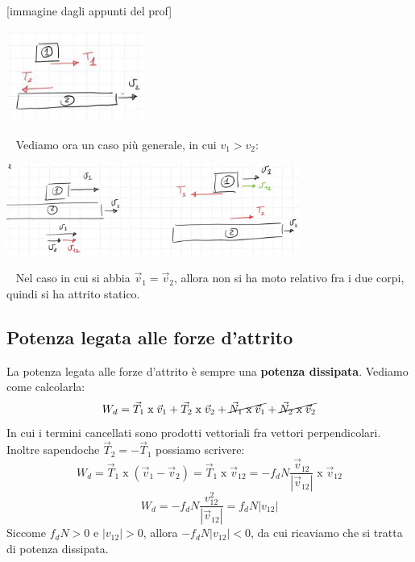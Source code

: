 [immagine dagli appunti del prof]
\begin{center}
    \includegraphics[height=3cm]{../lezione11/img6.JPG}
\end{center}
\ \newline
Vediamo ora un caso più generale, in cui $v_1 > v_2$:
\begin{center}
    \includegraphics[height=3cm]{../lezione11/img7.JPG}
\end{center}
\ \newline
Nel caso in cui si abbia $\vec{v}_1 = \vec{v}_2$, allora non si ha moto relativo fra i due corpi, quindi si ha attrito statico.
\subsection{Potenza legata alle forze d'attrito}
La potenza legata alle forze d'attrito è sempre una \textbf{potenza dissipata}.\newline
\newline
Vediamo come calcolarla:
\[
    W_d = \vec{T}_1 \;\text{x}\;\vec{v}_1 + \vec{T}_2 \;\text{x}\; \vec{v}_2 + \cancel{\vec{N}_1 \;\text{x}\;\vec{v}_1} + \cancel{\vec{N}_2 \;\text{x}\; \vec{v}_2} 
\]
In cui i termini cancellati sono prodotti vettoriali fra vettori perpendicolari.\newline
Inoltre sapendoche $\vec{T}_2 = - \vec{T}_1$ possiamo scrivere:
\[
    W_d = \vec{T}_1 \; \text{x}\; (\vec{v}_1 - \vec{v}_2) = \vec{T}_1 \;\text{x}\; \vec{v}_{12} = - f_d N \frac{\vec{v}_{12}}{|\vec{v}_{12}|} \;\text{x}\;\vec{v}_{12}
\]
\[
    W_d = - f_d N \frac{v_{12}^2}{|\vec{v}_{12}|} = f_d N |v_{12}|
\]
Siccome $f_d N > 0$ e $|v_{12}| > 0$, allora $- f_d N |v_{12}| <0$, da cui ricaviamo che si tratta di potenza dissipata.
